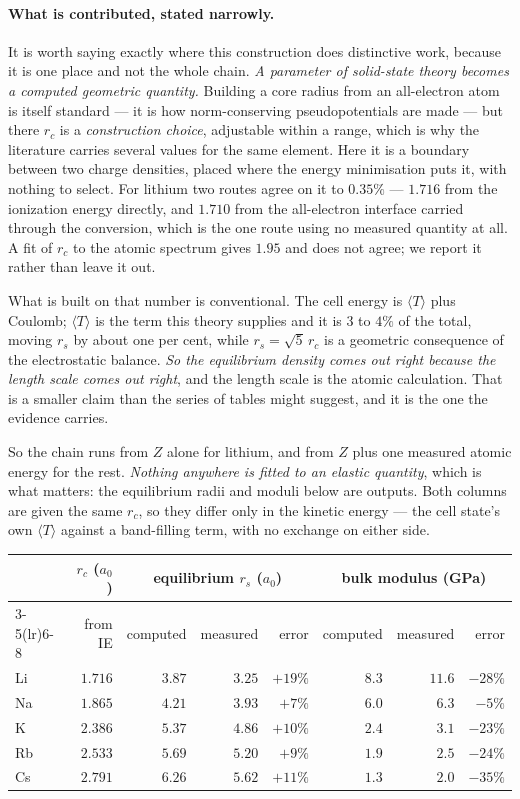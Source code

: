 \documentclass[11pt]{article}
\begin{document}
\paragraph{What is contributed, stated narrowly.} It is worth saying exactly where this construction
does distinctive work, because it is one place and not the whole chain. \emph{A parameter of
solid-state theory becomes a computed geometric quantity.} Building a core radius from an
all-electron atom is itself standard --- it is how norm-conserving pseudopotentials are made --- but
there $r_c$ is a \emph{construction choice}, adjustable within a range, which is why the literature
carries several values for the same element. Here it is a boundary between two charge densities,
placed where the energy minimisation puts it, with nothing to select. For lithium two routes agree
on it to $0.35\%$ --- $1.716$ from the ionization energy directly, and $1.710$ from the all-electron
interface carried through the conversion, which is the one route using no measured quantity at all.
A fit of $r_c$ to the atomic spectrum gives $1.95$ and does not agree; we report it rather than
leave it out.

What is built on that number is conventional. The cell energy is $\langle T\rangle$ plus Coulomb;
$\langle T\rangle$ is the term this theory supplies and it is $3$ to $4\%$ of the total, moving
$r_s$ by about one per cent, while $r_s=\sqrt{5}\,r_c$ is a geometric consequence of the
electrostatic balance. \emph{So the equilibrium density comes out right because the length scale
comes out right}, and the length scale is the atomic calculation. That is a smaller claim than the
series of tables might suggest, and it is the one the evidence carries.

So the chain runs from $Z$ alone for lithium, and from $Z$ plus one measured atomic energy for the
rest. \emph{Nothing anywhere is fitted to an elastic quantity}, which is what matters: the
equilibrium radii and moduli below are outputs. Both columns are given the same $r_c$, so they
differ only in the kinetic energy --- the cell state's own $\langle T\rangle$ against a band-filling
term, with no exchange on either side.

\begin{center}
\begin{tabular}{lrrrrrrr}
\toprule
 & $r_c$ ($a_0$) & \multicolumn{3}{c}{equilibrium $r_s$ ($a_0$)} & \multicolumn{3}{c}{bulk modulus (GPa)} \\
\cmidrule(lr){3-5}\cmidrule(lr){6-8}
 & from IE & computed & measured & error & computed & measured & error \\
\midrule
Li & $1.716$ & $3.87$ & $3.25$ & $+19\%$ & $8.3$ & $11.6$ & $-28\%$ \\
Na & $1.865$ & $4.21$ & $3.93$ & $+7\%$ & $6.0$ & $6.3$ & $-5\%$ \\
K & $2.386$ & $5.37$ & $4.86$ & $+10\%$ & $2.4$ & $3.1$ & $-23\%$ \\
Rb & $2.533$ & $5.69$ & $5.20$ & $+9\%$ & $1.9$ & $2.5$ & $-24\%$ \\
Cs & $2.791$ & $6.26$ & $5.62$ & $+11\%$ & $1.3$ & $2.0$ & $-35\%$ \\
\bottomrule
\end{tabular}
\end{center}
\end{document}
